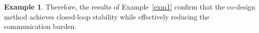 \documentclass[preprint,review,fleqn,sort&compress,3p]{elsarticle}
\theoremstyle{definition} %
\theoremstyle{definition}%
\newtheorem{example}{Example}
\begin{document}
\begin{example}

		
		Therefore, the results of Example~\ref{exm1} confirm that the co-design method achieves closed-loop stability while effectively reducing the communication burden.
		
	\end{example}
	
\end{document}
